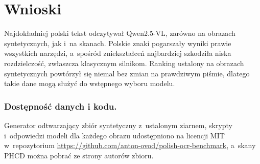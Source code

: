 \documentclass[runningheads,orivec]{llncs}
\begin{document}
\section{Wnioski}

Najdokładniej polski tekst odczytywał \mbox{Qwen2.5-VL}, zarówno na obrazach syntetycznych, jak i~na skanach.
Polskie znaki pogarszały wyniki prawie wszystkich narzędzi, a~spośród zniekształceń najbardziej szkodziła
niska rozdzielczość, zwłaszcza klasycznym silnikom. Ranking ustalony na obrazach syntetycznych
powtórzył się niemal bez zmian na prawdziwym piśmie, dlatego takie dane mogą służyć do wstępnego wyboru modelu.

\subsubsection*{Dostępność danych i kodu.}
Generator odtwarzający zbiór syntetyczny z~ustalonym ziarnem, skrypty i~odpowiedzi modeli dla każdego obrazu
udostępniono na licencji MIT
w~repozytorium \url{https://github.com/anton-ovod/polish-ocr-benchmark}, a~skany PHCD można pobrać ze strony
autorów zbioru.



\end{document}

